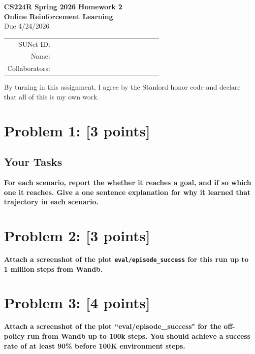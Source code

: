 \documentclass[12pt]{article}
\begin{document}
\begin{center}
{\Large \textbf{CS224R Spring 2026 Homework 2 \\ Online Reinforcement Learning}}
\\ {\large Due 4/24/2026}

\begin{tabular}{rl}
SUNet ID: & $\hspace{6cm}$\\
Name: & \\
Collaborators: & 
\end{tabular}
\end{center}

\noindent By turning in this assignment, I agree by the Stanford honor code and declare
that all of this is my own work.


\section*{Problem 1: [3 points]}


\subsection*{Your Tasks}


    \textbf{\color{red} For each scenario, report the whether it reaches a goal, and if so which one it reaches. Give a one sentence explanation for why it learned that trajectory in each scenario.}







\newpage


\section*{Problem 2: [3 points]}
 
\textbf{\color{red}Attach a screenshot of the plot \texttt{eval/episode\_success} for this run up to 1 million steps from Wandb. }








\newpage

\section*{Problem 3: [4 points]}


\noindent\textbf{\color{red}Attach a screenshot of the plot ``eval/episode\_success" for the off-policy run from Wandb up to 100k steps. You should achieve a success rate of at least 90\% before 100K environment steps.}
\end{document}
